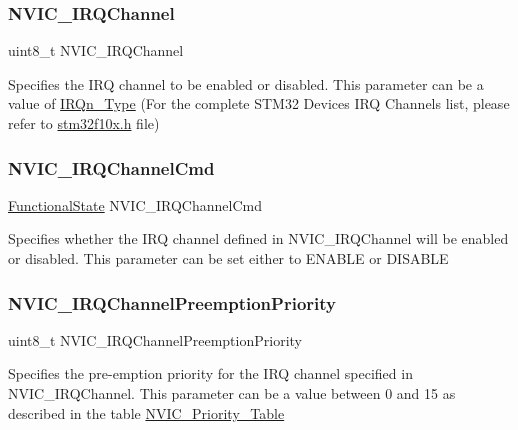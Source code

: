 \subsubsection{\texorpdfstring{NVIC\_IRQChannel}{NVIC\_IRQChannel}}
{\footnotesize\ttfamily uint8\+\_\+t N\+V\+I\+C\+\_\+\+I\+R\+Q\+Channel}

Specifies the I\+RQ channel to be enabled or disabled. This parameter can be a value of \mbox{\hyperlink{group___configuration__section__for___c_m_s_i_s_gac3af4a32370fb28c4ade8bf2add80251}{I\+R\+Qn\+\_\+\+Type}} (For the complete S\+T\+M32 Devices I\+RQ Channels list, please refer to \mbox{\hyperlink{stm32f10x_8h}{stm32f10x.\+h}} file) \mbox{\label{struct_n_v_i_c___init_type_def_a3c5567ef024a0489884083c88f17b4d5}} 
\subsubsection{\texorpdfstring{NVIC\_IRQChannelCmd}{NVIC\_IRQChannelCmd}}
{\footnotesize\ttfamily \mbox{\hyperlink{group___exported__types_gac9a7e9a35d2513ec15c3b537aaa4fba1}{Functional\+State}} N\+V\+I\+C\+\_\+\+I\+R\+Q\+Channel\+Cmd}

Specifies whether the I\+RQ channel defined in N\+V\+I\+C\+\_\+\+I\+R\+Q\+Channel will be enabled or disabled. This parameter can be set either to E\+N\+A\+B\+LE or D\+I\+S\+A\+B\+LE \mbox{\label{struct_n_v_i_c___init_type_def_aa395d7151e569272cbcf04420a1a4128}} 
\subsubsection{\texorpdfstring{NVIC\_IRQChannelPreemptionPriority}{NVIC\_IRQChannelPreemptionPriority}}
{\footnotesize\ttfamily uint8\+\_\+t N\+V\+I\+C\+\_\+\+I\+R\+Q\+Channel\+Preemption\+Priority}

Specifies the pre-\/emption priority for the I\+RQ channel specified in N\+V\+I\+C\+\_\+\+I\+R\+Q\+Channel. This parameter can be a value between 0 and 15 as described in the table \mbox{\hyperlink{group___n_v_i_c___priority___table}{N\+V\+I\+C\+\_\+\+Priority\+\_\+\+Table}} \mbox{\label{struct_n_v_i_c___init_type_def_a91b24559ddbc12752f2414582fb47cb9}} 
